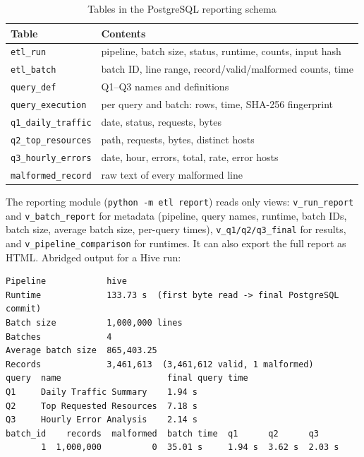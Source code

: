 \documentclass[conference]{IEEEtran}
\newcommand{\code}[1]{\texttt{\small #1}}
\begin{document}
\begin{table}[t]
\caption{Tables in the PostgreSQL reporting schema}
\label{tab:schema}
\centering
\small
\begin{tabular}{@{}p{}>{\raggedright\arraybackslash}p{}@{}}
\toprule
Table & Contents \\
\midrule
\code{etl\_run} & pipeline, batch size, status, runtime, counts, input hash \\
\code{etl\_batch} & batch ID, line range, record/valid/malformed counts, time \\
\code{query\_def} & Q1--Q3 names and definitions \\
\code{query\_execution} & per query and batch: rows, time, SHA-256 fingerprint \\
\code{q1\_daily\_traffic} & date, status, requests, bytes \\
\code{q2\_top\_resources} & path, requests, bytes, distinct hosts \\
\code{q3\_hourly\_errors} & date, hour, errors, total, rate, error hosts \\
\code{malformed\_record} & raw text of every malformed line \\
\bottomrule
\end{tabular}
\end{table}

The reporting module (\code{python -m etl report}) reads only views: \code{v\_run\_report}
and \code{v\_batch\_report} for metadata (pipeline, query names, runtime, batch IDs, batch
size, average batch size, per-query times), \code{v\_q1/q2/q3\_final} for results, and
\code{v\_pipeline\_comparison} for runtimes. It can also export the full report as HTML.
Abridged output for a Hive run:

\begin{lstlisting}[columns=fixed,basicstyle=\ttfamily\tiny]
Pipeline            hive
Runtime             133.73 s  (first byte read -> final PostgreSQL commit)
Batch size          1,000,000 lines
Batches             4
Average batch size  865,403.25
Records             3,461,613  (3,461,612 valid, 1 malformed)
query  name                     final query time
Q1     Daily Traffic Summary    1.94 s
Q2     Top Requested Resources  7.18 s
Q3     Hourly Error Analysis    2.14 s
batch_id    records  malformed  batch time  q1      q2      q3
       1  1,000,000          0  35.01 s     1.94 s  3.62 s  2.03 s
\end{lstlisting}
\end{document}
